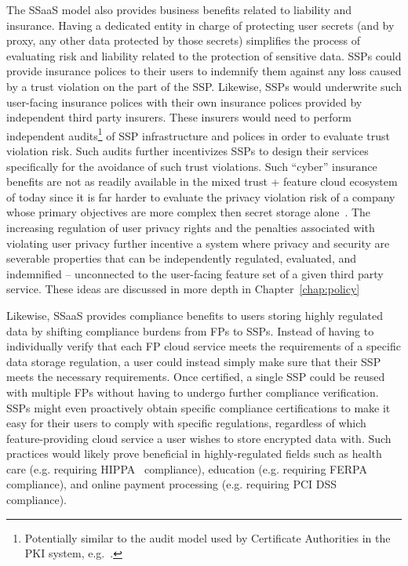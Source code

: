 The SSaaS model also provides business benefits related to liability
and insurance. Having a dedicated entity in charge of protecting user
secrets (and by proxy, any other data protected by those secrets)
simplifies the process of evaluating risk and liability related to the
protection of sensitive data. SSPs could provide insurance polices to
their users to indemnify them against any loss caused by a trust
violation on the part of the SSP. Likewise, SSPs would underwrite such
user-facing insurance polices with their own insurance polices
provided by independent third party insurers. These insurers would
need to perform independent audits\footnote{Potentially similar to the
  audit model used by Certificate Authorities in the PKI system,
  e.g.~\cite{hall-caaudit, mozilla-capolicy}.} of SSP infrastructure
and polices in order to evaluate trust violation risk. Such audits
further incentivizes SSPs to design their services specifically for
the avoidance of such trust violations. Such ``cyber'' insurance
benefits are not as readily available in the mixed trust + feature
cloud ecosystem of today since it is far harder to evaluate the
privacy violation risk of a company whose primary objectives are more
complex then secret storage alone~\cite{ciab2015}. The increasing
regulation of user privacy rights and the penalties associated with
violating user privacy further incentive a system where privacy and
security are severable properties that can be independently regulated,
evaluated, and indemnified -- unconnected to the user-facing feature
set of a given third party service. These ideas are discussed in more
depth in Chapter~\ref{chap:policy}

Likewise, SSaaS provides compliance benefits to users storing highly
regulated data by shifting compliance burdens from FPs to
SSPs. Instead of having to individually verify that each FP cloud
service meets the requirements of a specific data storage regulation,
a user could instead simply make sure that their SSP meets the
necessary requirements. Once certified, a single SSP could be reused
with multiple FPs without having to undergo further compliance
verification. SSPs might even proactively obtain specific compliance
certifications to make it easy for their users to comply with specific
regulations, regardless of which feature-providing cloud service a
user wishes to store encrypted data with. Such practices would likely
prove beneficial in highly-regulated fields such as health care
(e.g. requiring HIPPA~\cite{hippa} compliance), education
(e.g. requiring FERPA~\cite{ferpa} compliance), and online payment
processing (e.g. requiring PCI DSS~\cite{pcidss} compliance).

